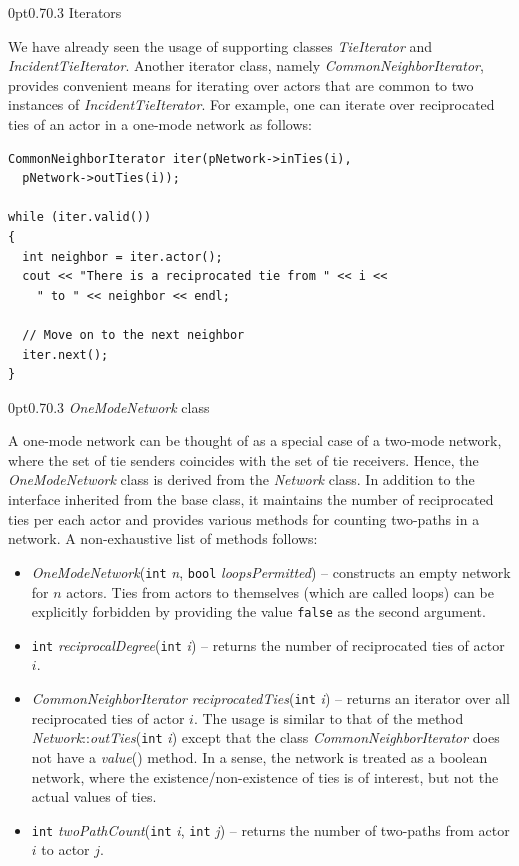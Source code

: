 \documentclass[12pt]{article}
\makeatletter
\renewcommand{\=}{\,=\,}
\newcommand{\+}{\,+\,}
\newcommand{\nnm}[1]{\textsf{\small\textit{#1}}}
\renewcommand{\subsection}{\@startsection{subsection}{2}
                {0pt}{0.7\baselineskip}{0.3\baselineskip}
                {\sffamily} }
\makeatother
\begin{document}
\subsection{Iterators}

We have already seen the usage of supporting classes \nnm{TieIterator} and
\nnm{IncidentTieIterator}. Another iterator class, namely
\nnm{CommonNeighborIterator}, provides convenient means for iterating over
actors that are common to two instances of \nnm{IncidentTieIterator}. For
example, one can iterate over reciprocated ties of an actor in a one-mode
network as follows:
\begin{verbatim}
CommonNeighborIterator iter(pNetwork->inTies(i),
  pNetwork->outTies(i));

while (iter.valid())
{
  int neighbor = iter.actor();
  cout << "There is a reciprocated tie from " << i <<
    " to " << neighbor << endl;

  // Move on to the next neighbor
  iter.next();
}
\end{verbatim}

\subsection{\nnm{OneModeNetwork} class}

A one-mode network can be thought of as a special case of a two-mode network,
where the set of tie senders coincides with the set of tie receivers. Hence,
the \nnm{OneModeNetwork} class is derived from the \nnm{Network} class. In
addition to the interface inherited from the base class, it maintains the number
of reciprocated ties per each actor and provides various methods for counting
two-paths in a network. A non-exhaustive list of methods follows:

\begin{itemize}
\item \nnm{OneModeNetwork}(\verb|int| \nnm{n},
\verb|bool| \nnm{loopsPermitted}) -- constructs an empty network for $n$ actors.
Ties from actors to themselves (which are called loops) can be explicitly
forbidden by providing the value \verb|false| as the second argument.
\item \verb|int| \nnm{reciprocalDegree}(\verb|int| \nnm{i}) -- returns the
number of reciprocated ties of actor $i$.
\item \nnm{CommonNeighborIterator} \nnm{reciprocatedTies}(\verb|int| \nnm{i}) --
returns an iterator over all reciprocated ties of actor $i$. The usage is
similar to that of the method \nnm{Network}::\nnm{outTies}(\verb|int| \nnm{i})
except that the class \nnm{CommonNeighborIterator} does not have a \nnm{value}()
method. In a sense, the network is treated as a boolean network, where the
existence/non-existence of ties is of interest, but not the actual values of
ties.
\item \verb|int| \nnm{twoPathCount}(\verb|int| \nnm{i}, \verb|int| \nnm{j}) --
returns the number of two-paths from actor $i$ to actor $j$.
\end{itemize}
\end{document}
